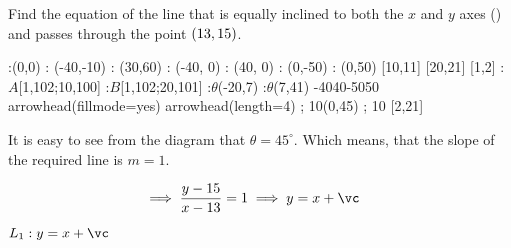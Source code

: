 



\SUBTRACT\vb\va\vc

\question[2] Find the equation of the line that is equally inclined to both the 
$x$ and $y$ axes (\asif) and passes through the point $(13, 15)$.

\watchout

\begin{marginfigure}
    \def\xmin{-40}
    \def\xmax{40}
    \def\ymin{-50}
    \def\ymax{50}
    \def\rotangle{45}
    :(0,0)
    : (-40,-10)
    : (30,60)
    : (\xmin, 0)
    : (\xmax, 0)
    : (0,\ymin)
    : (0,\ymax)
     [10,11] %
     [20,21] %
     [1,2]
     :$A$[1,102;10,100]
     :$B$[1,102;20,101]
    :$\theta$(-20,7)
    :$\theta$(7,41)
  \figdrawbegin{}
    \xmin\xmax\ymin\ymax
    \figdrawline [1,2]
    \figset arrowhead(fillmode=yes)
    \figdrawarrowhead [1,2]
    \figdrawarrowhead [2,1]
    \figset arrowhead(length=4) 
     ; 10(0,45)
     ; 10 [2,21]
  \figdrawend
  \centerline{\box\figBoxA}
\end{marginfigure}

\begin{solution}[\halfpage]
    It is easy to see from the diagram that $\theta=45^\circ$. Which means, that the slope of the 
    required line is $m=1$.

    \begin{align}
    	\implies \dfrac{y-\vb}{x-\va} &= 1 \implies y = x + \vc
    \end{align}
\end{solution}

\ifprintanswers
  \begin{codex}
    $L_1: y = x + \vc$
  \end{codex}
\fi
